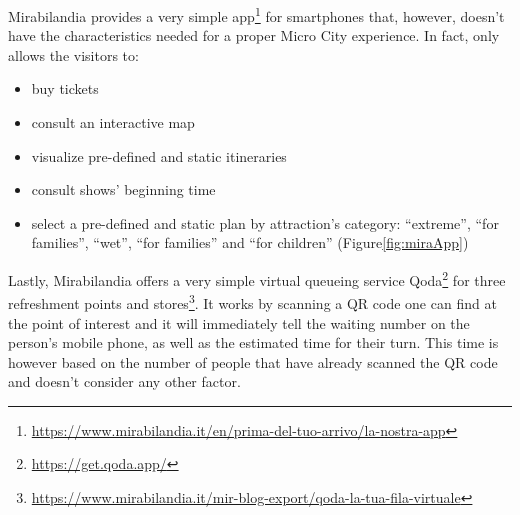 Mirabilandia provides a very simple app\footnote{\url{https://www.mirabilandia.it/en/prima-del-tuo-arrivo/la-nostra-app}} for smartphones that, however, doesn't have the characteristics needed for a proper Micro City experience.
In fact, only allows the visitors to:
\begin{itemize}
	\item buy tickets
	\item consult an interactive map
	\item visualize pre-defined and static itineraries
	\item consult shows' beginning time
	\item select a pre-defined and static plan by attraction's category: ``extreme'', ``for families'', ``wet'', ``for families'' and ``for children'' (Figure\ref{fig:miraApp})
\end{itemize}

Lastly, Mirabilandia offers a very simple virtual queueing service Qoda\footnote{\url{https://get.qoda.app/}} for three refreshment points and stores\footnote{\url{https://www.mirabilandia.it/mir-blog-export/qoda-la-tua-fila-virtuale}}.
It works by scanning a QR code one can find at the point of interest and it will immediately tell the waiting number on the person's mobile phone, as well as the estimated time for their turn.
This time is however based on the number of people that have already scanned the QR code and doesn't consider any other factor.

